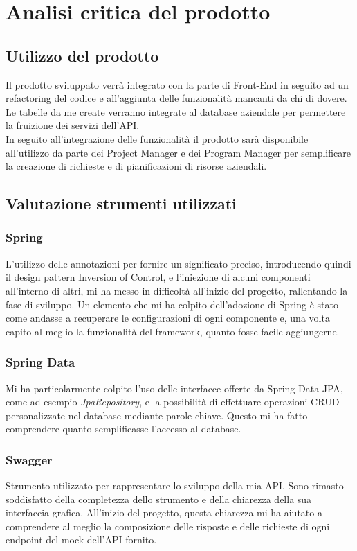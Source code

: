 \section{Analisi critica del prodotto}
\subsection{Utilizzo del prodotto}
Il prodotto sviluppato verrà integrato con la parte di Front-End in seguito ad un refactoring del codice e all'aggiunta delle funzionalità mancanti da chi di dovere. Le tabelle da me create verranno integrate al database aziendale per permettere la fruizione dei servizi dell'API.\\ In seguito all'integrazione delle funzionalità il prodotto sarà disponibile all'utilizzo da parte dei Project Manager e dei Program Manager per semplificare la creazione di richieste e di pianificazioni di risorse aziendali.

\subsection{Valutazione strumenti utilizzati}
\subsubsection*{Spring}
L'utilizzo delle annotazioni per fornire un significato preciso, introducendo quindi il design pattern Inversion of Control, e l'iniezione di alcuni componenti all'interno di altri, mi ha messo in difficoltà all'inizio del progetto, rallentando la fase di sviluppo.
Un elemento che mi ha colpito dell'adozione di Spring è stato come andasse a recuperare le configurazioni di ogni componente e, una volta capito al meglio la funzionalità del framework, quanto fosse facile aggiungerne.

\subsubsection*{Spring Data}
Mi ha particolarmente colpito l'uso delle interfacce offerte da Spring Data JPA, come ad esempio \textit{JpaRepository}, e la possibilità di effettuare operazioni CRUD personalizzate nel database mediante parole chiave. Questo mi ha fatto comprendere quanto semplificasse l'accesso al database.

\subsubsection*{Swagger}
Strumento utilizzato per rappresentare lo sviluppo della mia API. Sono rimasto soddisfatto della completezza dello strumento e della chiarezza della sua interfaccia grafica. All'inizio del progetto, questa chiarezza mi ha aiutato a comprendere al meglio la composizione delle risposte e delle richieste di ogni endpoint del mock dell'API fornito.

